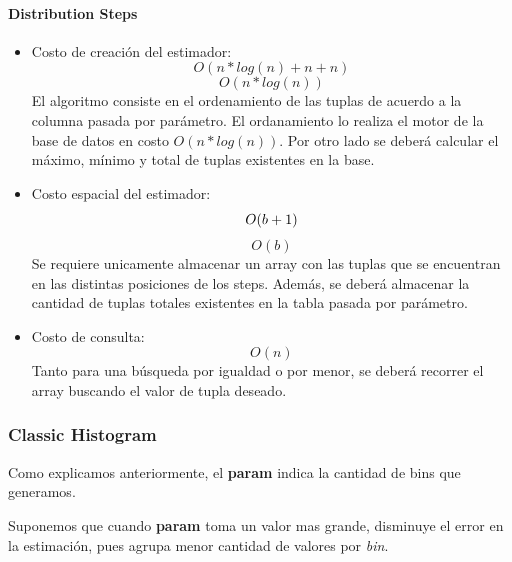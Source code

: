 \documentclass[10pt, a4paper,english,spanish,hidelinks]{article}
\begin{document}
\paragraph{Distribution Steps}

\begin{itemize}

\item Costo de creación del estimador:
\begin{equation}
O(n*log(n) + n + n)
\end{equation}
\begin{equation}
O(n*log(n))
\end{equation}
El algoritmo consiste en el ordenamiento de las tuplas de acuerdo a la columna pasada por
parámetro. El ordanamiento lo realiza el motor de la base de datos en costo $O(n*log(n))$.
Por otro lado se deberá calcular el máximo, mínimo y total de tuplas existentes en la base.

\item Costo espacial del estimador:
\begin{equation}
O(b + 1) \\
\end{equation}
\begin{equation}
O(b)
\end{equation}
Se requiere unicamente almacenar un array con las tuplas que se encuentran en las distintas
posiciones de los steps. Además, se deberá almacenar la cantidad de tuplas totales
existentes en la tabla pasada por parámetro.

\item Costo de consulta:
\begin{equation}
O(n)
\end{equation}
Tanto para una búsqueda por igualdad o por menor, se deberá recorrer el array buscando
el valor de tupla deseado.

\end{itemize}

\subsubsection{Classic Histogram}

Como explicamos anteriormente, el \textbf{param} indica la cantidad de bins que generamos.

Suponemos que cuando \textbf{param} toma un valor mas grande, disminuye el error en la estimación,
pues agrupa menor cantidad de valores por \textit{bin}.
\end{document}
